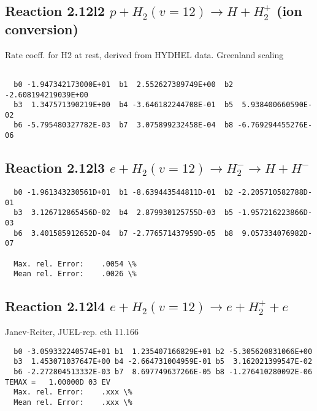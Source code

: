 \documentclass[12pt,dvipdfmx]{article}
\begin{document}
\subsection{
Reaction 2.12l2
$ p + H_2(v=12) \rightarrow H + H_2^+$ (ion conversion)
}
Rate coeff. for H2 at rest, derived from HYDHEL data. Greenland scaling


\begin{small}\begin{verbatim}

  b0 -1.947342173000E+01  b1  2.552627389749E+00  b2 -2.608194219039E+00
  b3  1.347571390219E+00  b4 -3.646182244708E-01  b5  5.938400660590E-02
  b6 -5.795480327782E-03  b7  3.075899232458E-04  b8 -6.769294455276E-06

\end{verbatim}\end{small}

\newpage

\subsection{
Reaction 2.12l3
 $ e + H_2(v=12) \rightarrow H_2^- \rightarrow H + H^-$
}


\begin{small}\begin{verbatim}
  b0 -1.961343230561D+01  b1 -8.639443544811D-01  b2 -2.205710582788D-01
  b3  3.126712865456D-02  b4  2.879930125755D-03  b5 -1.957216223866D-03
  b6  3.401585912652D-04  b7 -2.776571437959D-05  b8  9.057334076982D-07

  Max. rel. Error:    .0054 \%
  Mean rel. Error:    .0026 \%
\end{verbatim}\end{small}

\subsection{
Reaction 2.12l4
 $ e + H_2(v=12) \rightarrow e + H_2^+  + e$
}
Janev-Reiter, JUEL-rep. eth 11.166

\begin{small}\begin{verbatim}
  b0 -3.059332240574E+01 b1  1.235407166829E+01 b2 -5.305620831066E+00
  b3  1.453071037647E+00 b4 -2.664731004959E-01 b5  3.162021399547E-02
  b6 -2.272804513332E-03 b7  8.697749637266E-05 b8 -1.276410280092E-06
TEMAX =   1.00000D 03 EV
  Max. rel. Error:    .xxx \%
  Mean rel. Error:    .xxx \%
\end{verbatim}\end{small}
\newpage
\end{document}
